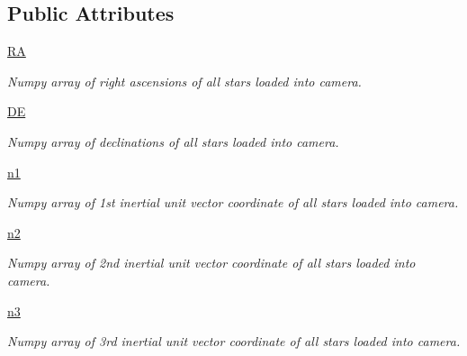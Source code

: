 \subsection*{Public Attributes}
\begin{DoxyCompactItemize}
\item 
\mbox{\label{classcamera_1_1camera_a61776d8f8dbe09543ef8af4b0cb5d4d8}} 
\hyperlink{classcamera_1_1camera_a61776d8f8dbe09543ef8af4b0cb5d4d8}{RA}
\begin{DoxyCompactList}\small\item\em Numpy array of right ascensions of all stars loaded into camera. \end{DoxyCompactList}\item 
\mbox{\label{classcamera_1_1camera_a3f95d3f1971bbca8905f9f3447d4a43e}} 
\hyperlink{classcamera_1_1camera_a3f95d3f1971bbca8905f9f3447d4a43e}{DE}
\begin{DoxyCompactList}\small\item\em Numpy array of declinations of all stars loaded into camera. \end{DoxyCompactList}\item 
\mbox{\label{classcamera_1_1camera_a6b8ba44bd26a27b6314105f165bfae10}} 
\hyperlink{classcamera_1_1camera_a6b8ba44bd26a27b6314105f165bfae10}{n1}
\begin{DoxyCompactList}\small\item\em Numpy array of 1st inertial unit vector coordinate of all stars loaded into camera. \end{DoxyCompactList}\item 
\mbox{\label{classcamera_1_1camera_a37eeb7ae4484dcee190dbffb3389b2ec}} 
\hyperlink{classcamera_1_1camera_a37eeb7ae4484dcee190dbffb3389b2ec}{n2}
\begin{DoxyCompactList}\small\item\em Numpy array of 2nd inertial unit vector coordinate of all stars loaded into camera. \end{DoxyCompactList}\item 
\mbox{\label{classcamera_1_1camera_a76bbd2634750375987f0db012e3b238b}} 
\hyperlink{classcamera_1_1camera_a76bbd2634750375987f0db012e3b238b}{n3}
\begin{DoxyCompactList}\small\item\em Numpy array of 3rd inertial unit vector coordinate of all stars loaded into camera. \end{DoxyCompactList}\item 

\end{DoxyCompactItemize}
